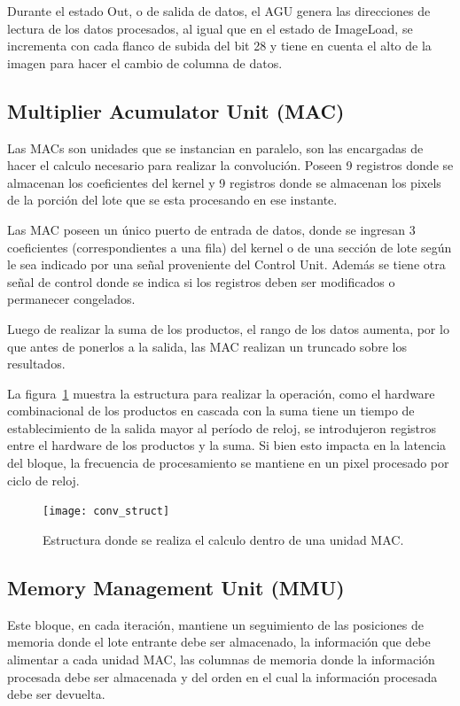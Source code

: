 Durante el estado Out, o de salida de datos, el AGU genera las direcciones de
lectura de los datos procesados, al igual que en el estado de ImageLoad, se
incrementa con cada flanco de subida del bit 28 y tiene en cuenta el alto de la
imagen para hacer el cambio de columna de datos.

\subsection{Multiplier Acumulator Unit (MAC)}

Las MACs son unidades que se instancian en paralelo, son las encargadas de
hacer el calculo necesario para realizar la convolución. Poseen 9 registros
donde se almacenan los coeficientes del kernel y 9 registros donde se almacenan
los pixels de la porción del lote que se esta procesando en ese instante.

Las MAC poseen un único puerto de entrada de datos, donde se ingresan 3
coeficientes (correspondientes a una fila) del kernel o de una sección de lote
según le sea indicado por una señal proveniente del Control Unit. Además se
tiene otra señal de control donde se indica si los registros deben ser
modificados o permanecer congelados.

Luego de realizar la suma de los productos, el rango de los datos aumenta, por
lo que antes de ponerlos a la salida, las MAC realizan un truncado sobre los resultados.

La figura~\ref{conv_struct} muestra la estructura para realizar la operación,
como el hardware combinacional de los productos en cascada con la suma tiene un
tiempo de establecimiento de la salida mayor al período de reloj, se
introdujeron registros entre el hardware de los productos y la suma. Si bien
esto impacta en la latencia del bloque, la frecuencia de procesamiento se
mantiene en un pixel procesado por ciclo de reloj. 

\begin{figure}
\centering
\texttt{[image: conv\_struct]}
\caption{Estructura donde se realiza el calculo dentro de una unidad MAC.}
\label{conv_struct}
\end{figure}

\subsection{Memory Management Unit (MMU)}

Este bloque, en cada iteración, mantiene un seguimiento de las posiciones de
memoria donde el lote entrante debe ser almacenado, la información que debe
alimentar a cada unidad MAC, las columnas de memoria donde la información
procesada debe ser almacenada y del orden en el cual la información procesada
debe ser devuelta.

